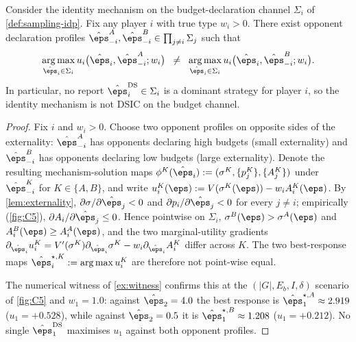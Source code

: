 \begin{proposition}
\label{prop:non-strategyproof}
Consider the identity mechanism on the budget-declaration channel
$\Sigma_i$ of \cref{def:sampling-idp}. Fix any player $i$ with true
type $w_i > 0$. There exist opponent declaration profiles
$\hat\eps_{-i}^{A}, \hat\eps_{-i}^{B} \in \prod_{j\neq i} \Sigma_j$
such that
\[
\underset{\hat\eps_i \in \Sigma_i}{\arg\max}\, u_i\bigl(\hat\eps_i,
\hat\eps_{-i}^{A}; w_i\bigr)
\;\;\neq\;\;
\underset{\hat\eps_i \in \Sigma_i}{\arg\max}\, u_i\bigl(\hat\eps_i,
\hat\eps_{-i}^{B}; w_i\bigr).
\]
In particular, no report $\hat\eps_i^{\mathrm{DS}} \in \Sigma_i$ is a
dominant strategy for player $i$, so the identity mechanism is not
DSIC on the budget channel.
\end{proposition}

\begin{proof}
Fix $i$ and $w_i > 0$. Choose two opponent profiles on opposite sides
of the externality: $\hat\eps_{-i}^{A}$ has opponents declaring high
budgets (small externality) and $\hat\eps_{-i}^{B}$ has opponents
declaring low budgets (large externality). Denote the resulting
mechanism-solution maps
$\phi^{K}(\hat\eps_i) := (\sigma^K, \{p_j^K\}, \{A_j^K\})$ under
$\hat\eps_{-i}^{K}$ for $K \in \{A, B\}$, and write
$u_i^{K}(\eps) := V(\sigma^{K}(\eps)) - w_i A_i^{K}(\eps)$. By
\cref{lem:externality}, $\partial \sigma / \partial \hat\eps_j < 0$ and
$\partial p_i / \partial \hat\eps_j < 0$ for every $j \neq i$;
empirically (\cref{fig:C5}), $\partial A_i / \partial \hat\eps_j \le 0$.
Hence pointwise on $\Sigma_i$, $\sigma^{B}(\eps) > \sigma^{A}(\eps)$
and $A_i^{B}(\eps) \ge A_i^{A}(\eps)$, and the two marginal-utility
gradients
$\partial_{\hat\eps_i} u_i^{K} = V'(\sigma^{K})
\partial_{\hat\eps_i}\sigma^{K} - w_i \partial_{\hat\eps_i} A_i^{K}$
differ across $K$. The two best-response maps
$\hat\eps_i^{\star, K} := \arg\max u_i^{K}$ are therefore not
point-wise equal.

The numerical witness of \cref{ex:witness} confirms this at the
$(|G|, E_b, I, \delta)$ scenario of \cref{fig:C5} and $w_1 = 1.0$:
against $\hat\eps_2 = 4.0$ the best response is $\hat\eps_1^{\star,A}
\approx 2.919$ ($u_1 = +0.528$), while against $\hat\eps_2 = 0.5$ it is
$\hat\eps_1^{\star,B} \approx 1.208$ ($u_1 = +0.212$). No single
$\hat\eps_1^{\mathrm{DS}}$ maximises $u_1$ against both opponent
profiles.
\end{proof}

